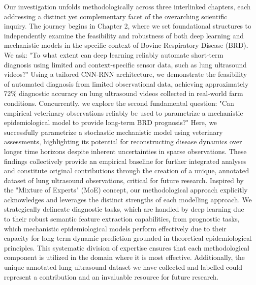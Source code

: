 Our investigation unfolds methodologically across three interlinked chapters, each addressing a distinct yet complementary facet of the overarching scientific inquiry. The journey begins in Chapter 2, where we set foundational structures to independently examine the feasibility and robustness of both deep learning and mechanistic models in the specific context of Bovine Respiratory Disease (BRD). We ask: "To what extent can deep learning reliably automate short-term diagnosis using limited and context-specific sensor data, such as lung ultrasound videos?" Using a tailored CNN-RNN architecture, we demonstrate the feasibility of automated diagnosis from limited observational data, achieving approximately 72\% diagnostic accuracy on lung ultrasound videos collected in real-world farm conditions. Concurrently, we explore the second fundamental question: "Can empirical veterinary observations reliably be used to parametrize a mechanistic epidemiological model to provide long-term BRD prognosis?" Here, we successfully parametrize a stochastic mechanistic model using veterinary assessments, highlighting its potential for reconstructing disease dynamics over longer time horizons despite inherent uncertainties in sparse observations. These findings collectively provide an empirical baseline for further integrated analyses and constitute original contributions through the creation of a unique, annotated dataset of lung ultrasound observations, critical for future research. Inspired by the "Mixture of Experts" (MoE) concept, our methodological approach explicitly acknowledges and leverages the distinct strengths of each modelling approach. We strategically delineate diagnostic tasks, which are handled by deep learning due to their robust semantic feature extraction capabilities, from prognostic tasks, which mechanistic epidemiological models perform effectively due to their capacity for long-term dynamic prediction grounded in theoretical epidemiological principles. This systematic division of expertise ensures that each methodological component is utilized in the domain where it is most effective. Additionally, the unique annotated lung ultrasound dataset we have collected and labelled could represent a contribution and an invaluable resource for future research.


